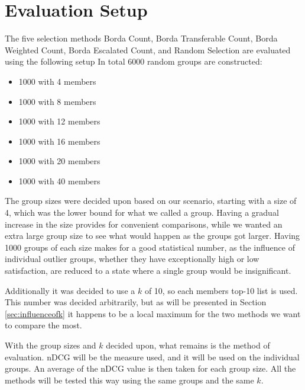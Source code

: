 \section{Evaluation Setup} \label{sec:evaluationsetup}
The five selection methods Borda Count, Borda Transferable Count, Borda Weighted Count, Borda Escalated Count, and Random Selection are evaluated using the following setup
In total 6000 random groups are constructed:

\begin{itemize}
	\item 1000 with 4 members
	\item 1000 with 8 members
	\item 1000 with 12 members
	\item 1000 with 16 members
	\item 1000 with 20 members
	\item 1000 with 40 members
\end{itemize}

The group sizes were decided upon based on our scenario, starting with a size of 4, which was the lower bound for what we called a group. Having a gradual increase in the size provides for convenient comparisons, while we wanted an extra large group size to see what would happen as the groups got larger. 
Having 1000 groups of each size makes for a good statistical number, as the influence of individual outlier groups, whether they have exceptionally high or low satisfaction, are reduced to a state where a single group would be insignificant.

Additionally it was decided to use a $k$ of 10, so each members top-10 list is used. This number was decided arbitrarily, but as will be presented in Section \ref{sec:influenceofk} it happens to be a local maximum for the two methods we want to compare the most.

With the group sizes and $k$ decided upon, what remains is the method of evaluation. nDCG will be the measure used, and it will be used on the individual groups. An average of the nDCG value is then taken for each group size. All the methods will be tested this way using the same groups and the same $k$.







